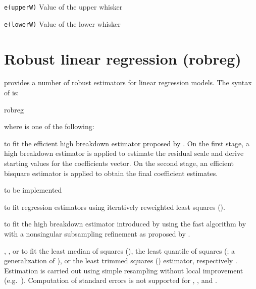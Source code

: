 \texttt{e(upperW)} Value of the upper whisker

\texttt{e(lowerW)} Value of the lower whisker




\section{Robust linear regression (robreg)}
\label{sec:syntax:robreg}

 provides a number of robust estimators for linear
regression models. The syntax of  is:

\begin{stsyntax}
    robreg 
    \depvar\
    \optindepvars\
    \optif\
    \optin\
\end{stsyntax}

\noindent
where  is one of the following:

\hangpara
     to fit the efficient high breakdown  estimator proposed
    by \citet{yohai:1987}. On the first stage, a high breakdown 
    estimator is applied to estimate the residual scale and derive starting
    values for the coefficients vector. On the second stage, an efficient
    bisquare \stsc{M} estimator is applied to obtain the final coefficient
    estimates.

\hangpara
    \stcmd{gm} \alert{to be implemented}

\hangpara
     to fit regression  estimators \citep{huber73} using
    iteratively reweighted least squares ().

\hangpara
    \stcmd{s} to fit the high breakdown \stcmd{S} estimator introduced by
    \citet{rousseeuw:yohai:1984} using the fast algorithm by
    \cite{salibian:yohai:2006} with a nonsingular subsampling refinement as
    proposed by \citet{Koller:2012}.

\hangpara
    \stcmd{lms}, \stcmd{lqs}, or \stcmd{lts} to fit the least median of squares
    (\stsc{LMS}), the least quantile of squares (; a generalization
    of ), or the least trimmed squares () estimator,
    respectively \citep{rousseeuw:leroy:1987}. Estimation is carried out using
    simple resampling without local improvement (e.g.\
    \citealp[197]{rousseeuw:leroy:1987}). Computation of standard errors is not
    supported for \stcmd{lms}, \stcmd{lqs}, and \stcmd{lts}.

